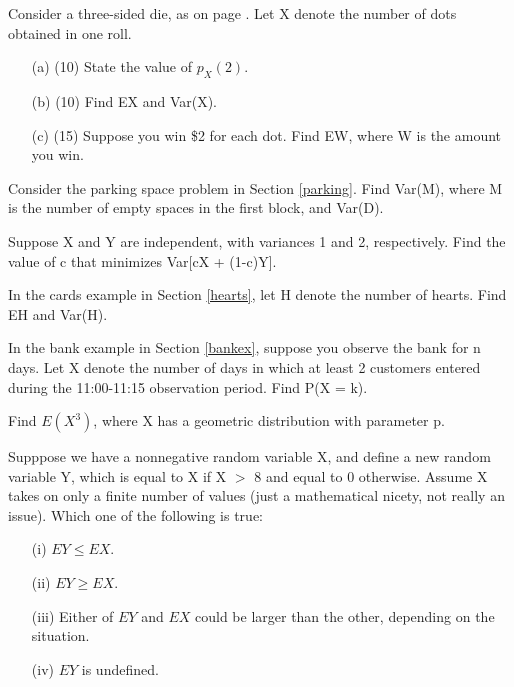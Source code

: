 \oneproblem
Consider a three-sided die, as on page \pageref{threesideddiepage}.  Let
X denote the number of dots obtained in one roll.

\begin{itemize}

   \item [(a)] (10) State the value of $p_X(2)$.

   \item [(b)] (10) Find EX and Var(X).

   \item [(c)] (15) Suppose you win \$2 for each dot.  Find EW,
   where W is the amount you win.

\end{itemize}

\oneproblem
Consider the parking space problem in Section \ref{parking}.  Find
Var(M), where M is the number of empty spaces in the first block, and
Var(D).

\oneproblem
Suppose X and Y are independent, with variances 1 and 2,
respectively.  Find the value of c that minimizes Var[cX + (1-c)Y].

\oneproblem
In the cards example in Section \ref{hearts}, let H denote the number of
hearts. Find EH and Var(H).

\oneproblem
In the bank example in Section \ref{bankex}, suppose you observe the
bank for n days. Let X denote the number of days in which at least 2 
customers entered during the 11:00-11:15 observation period. Find P(X = k).

\oneproblem
Find $E(X^3)$, where X has a geometric distribution with parameter p.

\oneproblem
Supppose we have a nonnegative random variable X, and define a new
random variable Y, which is equal to X if X $>$ 8 and equal to 0
otherwise.  Assume X takes on only a finite number of values (just a
mathematical nicety, not really an issue).  Which one of the following
is true:

\begin{itemize}

\item [(i)] $EY \leq EX$.

\item [(ii)] $EY \geq EX$.

\item [(iii)] Either of $EY$ and $EX$ could be larger than the other,
depending on the situation.

\item [(iv)] $EY$ is undefined.

\end{itemize}

